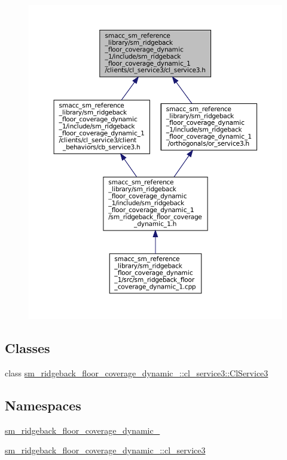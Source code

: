 \begin{figure}[H]
\begin{center}
\leavevmode
\includegraphics[width=350pt]{sm__ridgeback__floor__coverage__dynamic__1_2include_2sm__ridgeback__floor__coverage__dynamic__1_012d43a45faa65cdde20f8dcafa5338f}
\end{center}
\end{figure}
\subsection*{Classes}
\begin{DoxyCompactItemize}
\item 
class \hyperlink{classsm__ridgeback__floor__coverage__dynamic__1_1_1cl__service3_1_1ClService3}{sm\+\_\+ridgeback\+\_\+floor\+\_\+coverage\+\_\+dynamic\+\_\+::cl\+\_\+service3\+::\+Cl\+Service3}
\end{DoxyCompactItemize}
\subsection*{Namespaces}
\begin{DoxyCompactItemize}
\item 
 \hyperlink{namespacesm__ridgeback__floor__coverage__dynamic__1}{sm\+\_\+ridgeback\+\_\+floor\+\_\+coverage\+\_\+dynamic\+\_}
\item 
 \hyperlink{namespacesm__ridgeback__floor__coverage__dynamic__1_1_1cl__service3}{sm\+\_\+ridgeback\+\_\+floor\+\_\+coverage\+\_\+dynamic\+\_\+::cl\+\_\+service3}
\end{DoxyCompactItemize}
